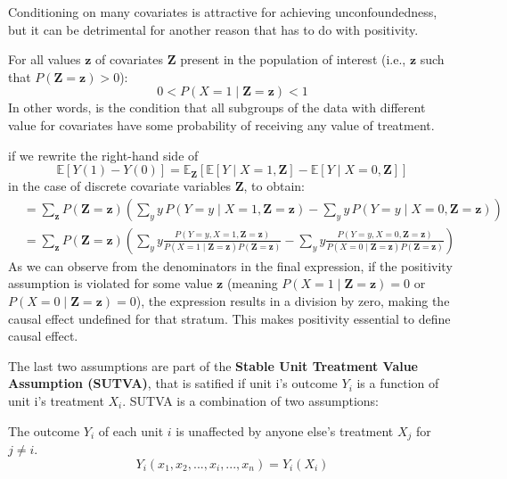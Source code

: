 \noindent
Conditioning on many covariates is attractive for achieving unconfoundedness, but it can be 
detrimental for another reason that has to do with positivity.
\begin{definition}
    For all values $\bm{z}$ of covariates $\bm{Z}$ present in the population of interest (i.e., $\bm{z}$ such that $P(\bm{Z} = \bm{z}) > 0$):
    \begin{equation}
        0 < P(X = 1 \mid \bm{Z} = \bm{z}) < 1
    \end{equation}
    In other words, is the condition that all subgroups of the data with different value for covariates
    have some probability of receiving any value of treatment.
\end{definition}
\begin{remark}
if we rewrite the right-hand side of 
\[
\mathbb{E}[Y(1) - Y(0)] = \mathbb{E}_{\mathbf{Z}}[\mathbb{E}[Y \mid X = 1, \mathbf{Z}] - \mathbb{E}[Y \mid X = 0, \mathbf{Z}]]
\]
in the case of discrete covariate variables $\mathbf{Z}$, to obtain:
\begin{align*}
    &= \sum_{\mathbf{z}} P(\mathbf{Z} = \mathbf{z}) \left( \sum_{y} y \, P(Y = y \mid X = 1, \mathbf{Z} = \mathbf{z}) - \sum_{y} y \, P(Y = y \mid X = 0, \mathbf{Z} = \mathbf{z}) \right) \\
    &= \sum_{\mathbf{z}} P(\mathbf{Z} = \mathbf{z}) \left( \sum_{y} y \frac{P(Y = y, X = 1, \mathbf{Z} = \mathbf{z})}{P(X = 1 \mid \mathbf{Z} = \mathbf{z}) P(\mathbf{Z} = \mathbf{z})} - \sum_{y} y \frac{P(Y = y, X = 0, \mathbf{Z} = \mathbf{z})}{P(X = 0 \mid \mathbf{Z} = \mathbf{z}) P(\mathbf{Z} = \mathbf{z})} \right)
\end{align*}
As we can observe from the denominators in the final expression, if the positivity assumption 
is violated for some value $\mathbf{z}$ (meaning $P(X = 1 \mid \mathbf{Z} = \mathbf{z}) = 0$ 
or $P(X = 0 \mid \mathbf{Z} = \mathbf{z}) = 0$), the expression results in a division by zero, 
making the causal effect undefined for that stratum. This makes positivity essential to define causal 
effect.
\end{remark}
\noindent
The last two assumptions are part of the \textbf{Stable Unit Treatment Value Assumption (SUTVA)}, that 
is satified if unit i's outcome $Y_i$ is a function of unit i's treatment $X_i$. SUTVA is a combination
of two assumptions:
\begin{definition}[No Interference]
    The outcome $Y_i$ of each unit $i$ is unaffected by anyone else's treatment $X_j$ 
    for $j \neq i$.
    \begin{equation}
        Y_i(x_1,x_2,...,x_i,...,x_n) = Y_i(X_i)
    \end{equation}
\end{definition}
